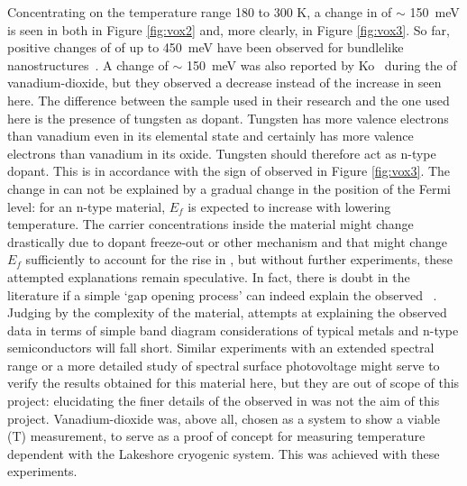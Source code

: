 Concentrating on the temperature range 180 to 300 K, a change in \wf{} of $\sim$ \SI{150}{\milli\electronvolt} is seen in both in Figure \ref{fig:vox2} and, more clearly, in Figure \ref{fig:vox3}. So far, positive changes of \wf{} of up to \SI{450}{\milli\electronvolt} have been observed for bundlelike \vadiox{} nanostructures~\cite{yin_450change}. A change of $\sim$ \SI{150}{\milli\electronvolt} was also reported by Ko~\cite{ko_kp} during the \mit{} of vanadium-dioxide, but they observed a decrease instead of the increase in \wf{} seen here. The difference between the sample used in their research and the one used here is the presence of tungsten as dopant. Tungsten has more valence electrons than vanadium even in its elemental state and certainly has more valence electrons than vanadium in its oxide. Tungsten should therefore act as n-type dopant. This is in accordance with the sign of \spv{} observed in Figure \ref{fig:vox3}. The change in \wf{} can not be explained by a gradual change in the position of the Fermi level: for an n-type material, $E_f$ is expected to increase with lowering temperature. The carrier concentrations inside the material might change drastically due to dopant freeze-out or other mechanism and that might change $E_f$ sufficiently to account for the rise in \wf{}, but without further experiments, these attempted explanations remain speculative. In fact, there is doubt in the literature if a simple `gap opening process' can indeed explain the observed \mit{}~\cite{eyert_theobands,booth_theobands}. Judging by the complexity of the material, attempts at explaining the observed data in terms of simple band diagram considerations of typical metals and n-type semiconductors will fall short. Similar experiments with an extended spectral range or a more detailed study of spectral surface photovoltage might serve to verify the results obtained for this material here, but they are out of scope of this project: elucidating the finer details of the \mit{} observed in \wvadiox{} was not the aim of this project. Vanadium-dioxide was, above all, chosen as a system to show a viable \spv{}(T) measurement, to serve as a proof of concept for measuring temperature dependent \spv{} with the Lakeshore cryogenic system. This was achieved with these experiments.

